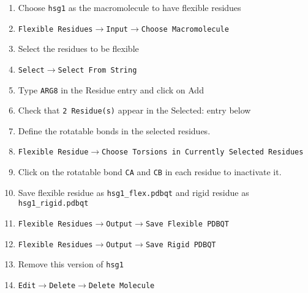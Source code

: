 \documentclass[slidestop,mathserif,compress,xcolor=svgnames]{beamer}
\newenvironment{eblock}[0]
{
\begin{beamerboxesrounded}[upper=uppercol2,lower=lowercol2,shadow=true]}
{\end{beamerboxesrounded}}
\begin{document}
\begin{frame}[allowframebreaks]
  \begin{eblock}{}
    \begin{enumerate}
      \item Choose \texttt{hsg1} as the macromolecule to have flexible residues
      \item[] \texttt{Flexible Residues$\rightarrow$Input$\rightarrow$Choose Macromolecule}
      \item Select the residues to be flexible
      \item[] \texttt{Select$\rightarrow$Select From String}
      \item[] Type \texttt{ARG8} in the Residue entry and click on Add
      \item[] Check that \texttt{2 Residue(s)} appear in the Selected: entry below
      \item Define the rotatable bonds in the selected residues.
      \item[] \texttt{Flexible Residue$\rightarrow$Choose Torsions in Currently Selected Residues}
      \item[] Click on the rotatable bond \texttt{CA} and \texttt{CB} in each residue to inactivate it.
      \item Save flexible residue as \texttt{hsg1\_flex.pdbqt} and rigid residue as \texttt{hsg1\_rigid.pdbqt}
      \item[] \texttt{Flexible Residues$\rightarrow$Output$\rightarrow$Save Flexible PDBQT}
      \item[] \texttt{Flexible Residues$\rightarrow$Output$\rightarrow$Save Rigid PDBQT}
      \item Remove this version of \texttt{hsg1}
      \item[] \texttt{Edit$\rightarrow$Delete$\rightarrow$Delete Molecule}
    \end{enumerate}
  \end{eblock}
\end{frame}
\end{document}

